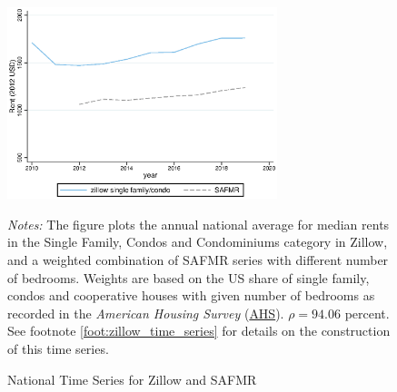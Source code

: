 \begin{figure}[!h]
	\centering
	\caption{National Time Series for Zillow and SAFMR}
	\label{fig:trend_zillow_safmrwgt}
	\includegraphics[width = 0.7\textwidth]{../../analysis/zillow_benchmark/output/trend_zillow_safmrwgt_zipcode_avg.eps}
	\begin{minipage}{0.95\textwidth} \footnotesize
		\vspace{3mm}
		\textit{Notes:} The figure plots the annual national average for median	rents in the Single 
		Family, Condos and Condominiums category in Zillow, and a weighted combination of SAFMR series 
		with different number of bedrooms. Weights are based on the US share of single family, 
		condos and cooperative houses with given number of bedrooms as recorded in the \textit{American Housing 
		Survey} (\href{https://www.census.gov/programs-surveys/ahs.html}{AHS}). $\rho = 94.06$ percent. 
		See footnote \ref{foot:zillow_time_series} for details on the construction of this time series.  
	\end{minipage}
\end{figure}

